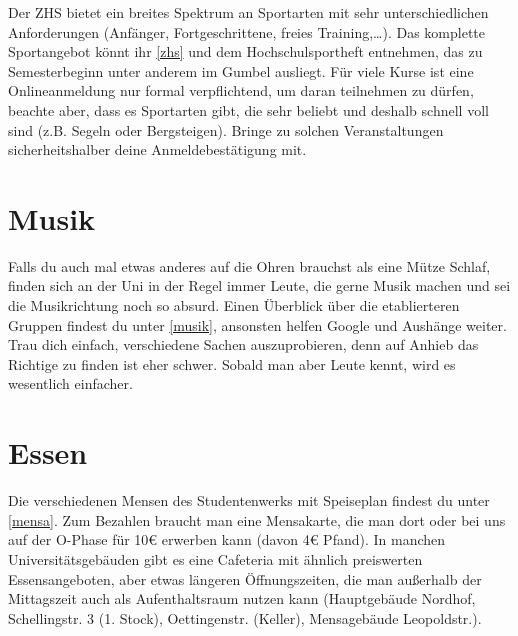 Der ZHS bietet ein breites Spektrum an Sportarten mit sehr unterschiedlichen
Anforderungen (Anfänger, Fortgeschrittene, freies Training,\ldots). Das
komplette Sportangebot könnt ihr \ref{zhs} und dem Hochschulsportheft
entnehmen, das zu Semesterbeginn unter anderem im Gumbel ausliegt. Für viele
Kurse ist eine Onlineanmeldung nur formal verpflichtend, um daran teilnehmen zu
dürfen, beachte aber, dass es Sportarten gibt, die sehr beliebt und deshalb
schnell voll sind (z.B. Segeln oder Bergsteigen). Bringe zu solchen
Veranstaltungen sicherheitshalber deine Anmeldebestätigung mit.

\begin{urlList}
\end{urlList}

\section{Musik} Falls du auch mal etwas anderes auf die Ohren brauchst als eine
Mütze Schlaf, finden sich an der Uni in der Regel immer Leute, die gerne Musik
machen und sei die Musikrichtung noch so absurd. Einen Überblick über die
etablierteren Gruppen findest du unter \ref{musik}, ansonsten helfen Google und
Aushänge weiter. Trau dich einfach, verschiedene Sachen auszuprobieren, denn
auf Anhieb das Richtige zu finden ist eher schwer. Sobald man aber Leute kennt,
wird es wesentlich einfacher.

\begin{urlList}
\end{urlList}


\section{Essen}

Die verschiedenen Mensen des Studentenwerks mit Speiseplan findest du unter \ref{mensa}. Zum Bezahlen braucht man eine Mensakarte, die man dort oder bei uns auf der O-Phase für 10€ erwerben kann (davon 4€ Pfand). In manchen Universitätsgebäuden gibt es eine Cafeteria mit ähnlich preiswerten Essensangeboten, aber etwas längeren Öffnungszeiten, die man außerhalb der Mittagszeit auch als Aufenthaltsraum nutzen kann (Hauptgebäude Nordhof, Schellingstr. 3 (1. Stock), Oettingenstr. (Keller), Mensagebäude Leopoldstr.).

